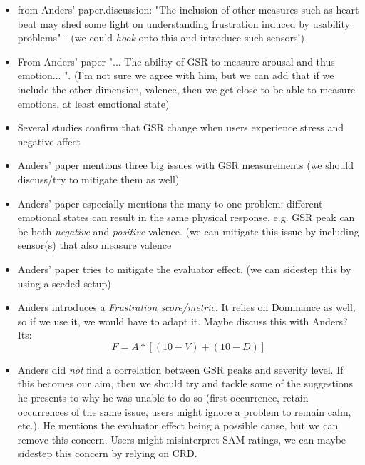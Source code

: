 \begin{itemize}
    \item from Anders' paper.discussion: "The inclusion of other measures such as heart
        beat may shed some light on understanding frustration induced by
        usability problems" - (we could \textit{hook} onto this and introduce such
        sensors!)
    \item From Anders' paper "... The ability of GSR to measure arousal and thus emotion... ". (I'm not sure we agree with him, but we can add that if we include the other dimension, valence, then we get close to be able to measure emotions, at least emotional state)
    \item Several studies confirm that GSR change when users experience stress and negative affect
    \item Anders' paper mentions three big issues with GSR measurements (we should discuss/try to mitigate them as well)
    \item Anders' paper especially mentions the many-to-one problem: different emotional states can result in the same physical response, e.g. GSR peak can be both \textit{negative} and \textit{positive} valence. (we can mitigate this issue by including sensor(s) that also measure valence
    \item Anders' paper tries to mitigate the evaluator effect. (we can sidestep this by using a seeded setup)
    \item Anders introduces a \textit{Frustration score/metric}. It relies on Dominance as well, so if we use it, we would have to adapt it. Maybe discuss this with Anders? Its: \[F = A * [(10-V) + (10-D)]\]

    \item Anders did \textit{not} find a correlation between GSR peaks and
        severity level. If this becomes our aim, then we should try and tackle
        some of the suggestions he presents to why he was unable to do so
        (first occurrence, retain occurrences of the same issue, users might
        ignore a problem to remain calm, etc.). He mentions the evaluator
        effect being a possible cause, but we can remove this concern. Users
        might misinterpret SAM ratings, we can maybe sidestep this concern by
        relying on CRD.
\end{itemize}


